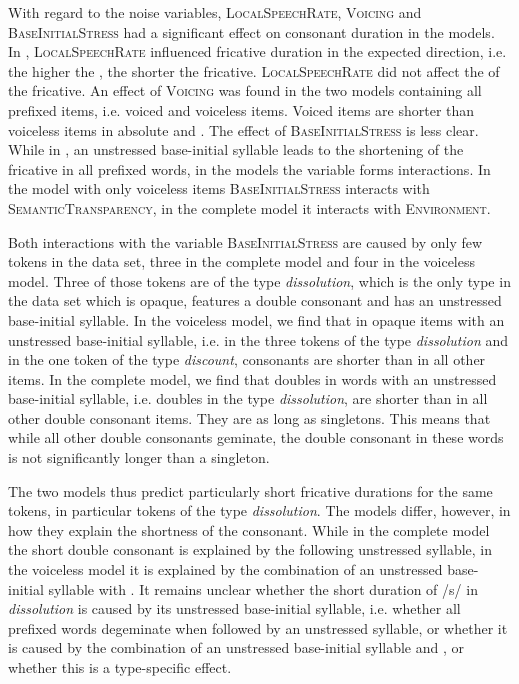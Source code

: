 With regard to the noise variables, \textsc{LocalSpeechRate}, \textsc{Voicing}  and \textsc{BaseInitialStress} had a significant effect on consonant duration in the models. 
In , \textsc{LocalSpeechRate} influenced fricative duration in the expected direction, i.e. the higher the , the shorter the fricative. \textsc{LocalSpeechRate} did not affect the  of the fricative. 
An effect of \textsc{Voicing} was found in the two models containing all prefixed items, i.e. voiced and voiceless items. Voiced items are shorter than voiceless items in absolute and .
The effect of \textsc{BaseInitialStress} is less clear. While in , an unstressed base-initial syllable leads to the shortening of the fricative in all prefixed words, in the  models the variable forms interactions. In the model with only voiceless items \textsc{BaseInitialStress} interacts with \textsc{SemanticTransparency},  in the complete model it interacts with \textsc{Environment}.



Both interactions with the variable \textsc{BaseInitialStress} are caused by only few tokens in the data set, three in the complete model and four in the voiceless model. Three of those tokens are of the type \textit{dissolution}, which is the only type in the data set which is opaque, features a double consonant and has an unstressed base-initial syllable. 
In the voiceless model, we find that in opaque items with an unstressed base-initial syllable, i.e. in the three tokens of the type \textit{dissolution} and in the one token of the type \textit{discount}, consonants are shorter than in all other items. 
In the complete model, we find that doubles in words with an unstressed base-initial syllable, i.e. doubles in the type \textit{dissolution}, are shorter than in all other double consonant items. They are as long as singletons. This means that while all other double consonants geminate, the double consonant in these words is not significantly longer than a singleton.

The two  models thus predict particularly short fricative durations for the same tokens, in particular tokens of the type \textit{dissolution}. The models differ, however, in how they explain the shortness of the consonant. While in the complete model the short double consonant is explained by the following unstressed syllable, in the voiceless model it is explained by the combination of an unstressed base-initial syllable with . It remains unclear whether the short duration of /s/ in \textit{dissolution} is caused by its unstressed base-initial syllable, i.e. whether all prefixed words degeminate when followed by an unstressed syllable, or whether it is caused by the combination of an unstressed base-initial syllable and , or whether this is a type-specific effect.


